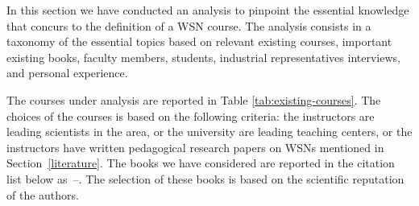 \documentclass[onecolumn,12pt,draftclsnofoot,a4paper,peerreview]{IEEEtran}
\begin{document}
In this section we have conducted an analysis to pinpoint the essential knowledge that concurs to the definition of a WSN course. The analysis consists in a taxonomy of the essential topics based on relevant existing courses, important existing books, faculty members, students, industrial representatives interviews, and personal experience. 

The courses under analysis are reported in Table \ref{tab:existing-courses}. The choices of the courses is based on the following criteria: the instructors are leading scientists in the area, or the university are leading teaching centers, or the instructors have written pedagogical research papers on WSNs mentioned in Section~\ref{literature}. The books we have considered are reported in the citation list below as~\cite{ZhaoGuibas04}--\cite{Mazumder11}. The selection of these books is based on the scientific reputation of the authors. 
\end{document}
